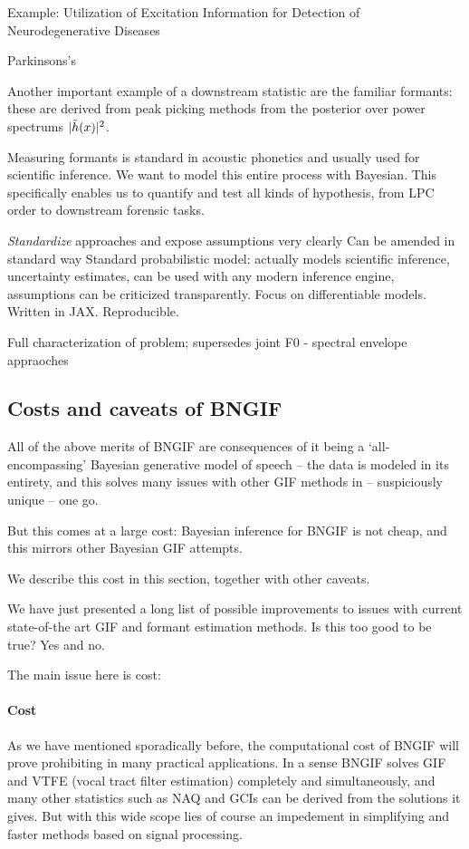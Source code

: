 \begin{chaptersections}
Example: Utilization of Excitation Information for
Detection of Neurodegenerative Diseases \citep{Kadiri2021}

Parkinsons's 

Another important example of a downstream statistic are the familiar formants: these are derived from peak picking methods from the posterior over power spectrums $|\tilde{h}(x)|^2$.

Measuring formants is standard in acoustic phonetics and usually used for scientific inference.
We want to model this entire process with Bayesian.
This specifically enables us to quantify and test all kinds of hypothesis, from LPC order to downstream forensic tasks.


\emph{Standardize} approaches and expose assumptions very clearly
Can be amended in standard way
Standard probabilistic model: actually models scientific inference, uncertainty estimates, can be used with any modern inference engine, assumptions can be criticized transparently.
Focus on differentiable models. Written in JAX. Reproducible.

Full characterization of problem; supersedes joint F0 - spectral envelope appraoches \citep{Yoshii2013}

\subsection{Costs and caveats of BNGIF}

All of the above merits of BNGIF are consequences of it being a `all-encompassing' Bayesian generative model of speech -- the data is modeled in its entirety, and this solves many issues with other GIF methods in -- suspiciously unique -- one go.

But this comes at a large cost: Bayesian inference for BNGIF is not cheap, and this mirrors other Bayesian GIF attempts.

We describe this cost in this section, together with other caveats.

We have just presented a long list of possible improvements to issues with current state-of-the art GIF and formant estimation methods.
Is this too good to be true?
Yes and no.

The main issue here is cost:

\paragraph{Cost}

As we have mentioned sporadically before, the computational cost of BNGIF will prove prohibiting in many practical applications.
In a sense BNGIF solves GIF and VTFE (vocal tract filter estimation) completely and simultaneously, and many other statistics such as NAQ and GCIs can be derived from the solutions it gives.
But with this wide scope lies of course an impedement in simplifying and faster methods based on signal processing.


\end{chaptersections}
